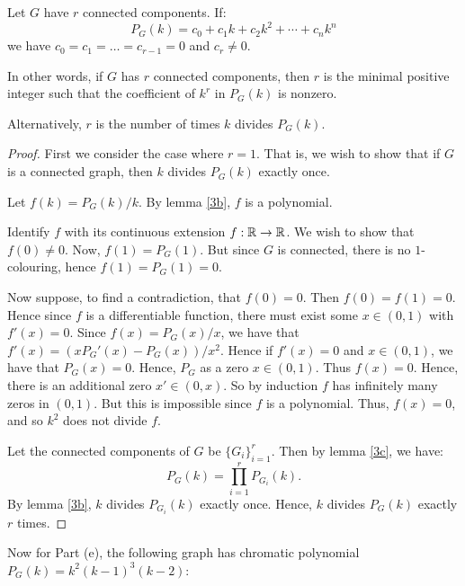 \documentclass{unswmaths}
\begin{document}
\begin{lemma}[Part (d)]
    Let $G$ have $r$ connected components. If:
    \begin{equation*}
        P_G(k) = c_0 + c_1k+c_2k^2 + \cdots + c_nk^n
    \end{equation*}
    we have $c_0 = c_1 = \ldots = c_{r-1} = 0$
    and $c_r \neq 0$.
    
    In other words, if $G$ has $r$ connected components, then
    $r$ is the minimal positive integer such that the coefficient
    of $k^r$ in $P_G(k)$ is nonzero.
    
    Alternatively, $r$ is the number of times $k$ divides $P_G(k)$.
    
\end{lemma}
\begin{proof}
    First we consider the case where $r = 1$. That is,
    we wish to show that if $G$ is a connected graph, 
    then $k$ divides $P_G(k)$ exactly once.
    
    Let $f(k) = P_G(k)/k$. By lemma \ref{3b}, $f$ is a polynomial.
    
    Identify $f$ with its continuous extension $f:\mathbb{R}\to \mathbb{R}$. 
    We wish to show that $f(0) \neq 0$. Now, $f(1) = P_G(1)$.
    But since $G$ is connected, there is no $1$-colouring, hence 
    $f(1) = P_G(1) = 0$.
    
    Now suppose, to find a contradiction, that $f(0) = 0$.
    Then $f(0) = f(1) = 0$. Hence since $f$ is a differentiable
    function, there must exist some $x \in (0,1)$ with $f'(x) = 0$.
    Since $f(x) = P_G(x)/x$, we have that $f'(x) = (xP_G'(x)-P_G(x))/x^2$.
    Hence if $f'(x) = 0$ and $x \in (0,1)$, we have that $P_G(x) = 0$.
    Hence, $P_G$ as a zero  $x \in (0,1)$. Thus $f(x) = 0$. Hence, 
    there is an additional zero $x' \in (0,x)$. So by induction
    $f$ has infinitely many zeros in $(0,1)$. But this is impossible
    since $f$ is a polynomial. Thus, $f(x) = 0$, and so $k^2$ does not
    divide $f$.

    Let the connected components of $G$ be $\{G_i\}_{i=1}^r$. Then
    by lemma \ref{3c}, we have:
    \begin{equation*}
        P_G(k) = \prod_{i=1}^r P_{G_i}(k).
    \end{equation*}
    By lemma \ref{3b}, $k$ divides $P_{G_i}(k)$ exactly once.
    Hence, $k$ divides $P_G(k)$ exactly $r$ times.
\end{proof}

Now for Part (e), the following graph has chromatic polynomial
$P_G(k) = k^2(k-1)^3(k-2)$:
\begin{center}
\end{center}
\end{document}
